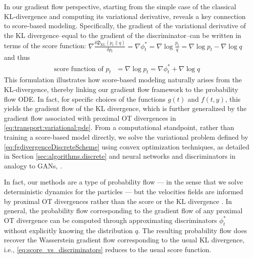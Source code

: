\documentclass{amsart}
\theoremstyle{definition}
\theoremstyle{remark}
\numberwithin{equation}{section}
\begin{document}
In our gradient flow perspective, starting from the simple case of the classical KL-divergence and computing its variational derivative, reveals a key connection to score-based modeling. Specifically, the gradient of the variational derivative of the KL divergence--equal to the gradient of the discriminator--can be written in terms of the score function: $\nabla\frac{\delta  \mathfrak{D}_{\mathrm{KL}}(p_t\|q)}{\delta p_t}=\nabla \phi^*_t=\nabla\log\frac{p_t}{q}=\nabla\log p_t-\nabla\log q$ and thus
\begin{eqnarray}\label{eq:score_vs_discriminators}
\textrm{score function of $p_t$ }=\nabla\log p_t=\nabla \phi^*_t+\nabla\log q
\end{eqnarray}
This formulation illustrates how score-based modeling  naturally arises from the  KL-divergence, thereby linking our gradient flow framework to the probability flow ODE. In fact, for specific choices of the functions $g(t)$ and $f(t,y)$, this yields the gradient flow of the KL divergence, which is further generalized by the gradient flow associated with proximal OT divergences in \eqref{eq:transport:variational:pde}. From a computational standpoint, rather than training a score-based model directly, we solve the variational problem defined by \eqref{eq:fgdivergenceDiscreteScheme} using convex optimization techniques, as detailed in Section \ref{sec:algorithms.discrete} and neural networks and discriminators in analogy to GANs, \cite{Gu_GPA}.

In fact, our methods are a type of probability flow --- in the sense that we solve deterministic dynamics for the particles --- but the velocities fields are informed by proximal OT divergences rather than the score \cite{Song2021ScoreBasedGM} or the KL divergence \cite{MaoutsaReichOpper}.  In general, the probability flow corresponding to the gradient flow of any proximal OT divergence can be computed through approximating discriminators $\phi_t^\ast$ without explicitly knowing the distribution $q$. The resulting probability flow does recover the Wasserstein gradient flow corresponding to the usual KL divergence, i.e., \eqref{eq:score_vs_discriminators} reduces to the usual score function. 


\end{document}

